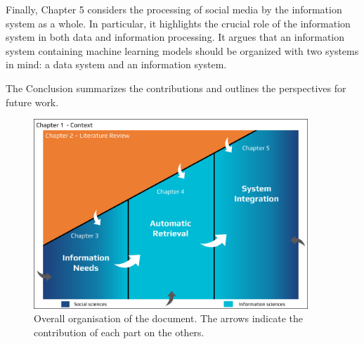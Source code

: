 Finally, Chapter 5 considers the processing of social media by the information system as a whole.
In particular, it highlights the crucial role of the information system in both data and information processing.
It argues that an information system containing machine learning models should be organized with two systems in mind: a data system and an information system.

The Conclusion summarizes the contributions and outlines the perspectives for future work.

\begin{figure}[h]
    \centering
    \includegraphics[width=0.92\textwidth,keepaspectratio]{figures/chap-0/big-picture.pdf}
    \caption{Overall organisation of the document. The arrows indicate the contribution of each part on the others.}
    \label{introduction:big-picture}
\end{figure}


